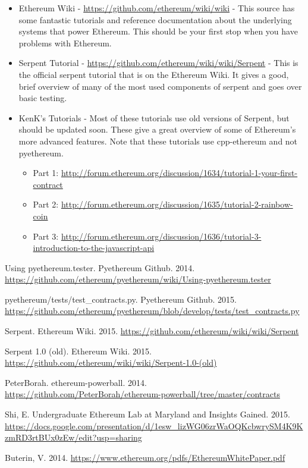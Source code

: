 \documentclass[12pt]{article}
\begin{document}
\begin{itemize}
	\item Ethereum Wiki - \url{https://github.com/ethereum/wiki/wiki} - This source has some fantastic tutorials and reference documentation about the underlying systems that power Ethereum. This should be your first stop when you have problems with Ethereum.
	\item Serpent Tutorial - \url{https://github.com/ethereum/wiki/wiki/Serpent} - This is the official serpent tutorial that is on the Ethereum Wiki. It gives a good, brief overview of many of the most used components of serpent and goes over basic testing.
	\item KenK's Tutorials - Most of these tutorials use old versions of Serpent, but should be updated soon. These give a great overview of some of Ethereum's more advanced features. Note that these tutorials use cpp-ethereum and not pyethereum.
	\begin{itemize}
	\item Part 1: \url{http://forum.ethereum.org/discussion/1634/tutorial-1-your-first-contract}
	\item Part 2: \url{http://forum.ethereum.org/discussion/1635/tutorial-2-rainbow-coin}
	\item Part 3: \url{http://forum.ethereum.org/discussion/1636/tutorial-3-introduction-to-the-javascript-api}
	\end{itemize}
\end{itemize}

\begin{thebibliography}{9}

	Using pyethereum.tester. Pyethereum Github. 2014. \url{https://github.com/ethereum/pyethereum/wiki/Using-pyethereum.tester}

	pyethereum/tests/test\_contracts.py. Pyethereum Github. 2015. \url{https://github.com/ethereum/pyethereum/blob/develop/tests/test_contracts.py}

	Serpent. Ethereum Wiki. 2015. \url{https://github.com/ethereum/wiki/wiki/Serpent}

	Serpent 1.0 (old). Ethereum Wiki. 2015. \url{https://github.com/ethereum/wiki/wiki/Serpent-1.0-(old)}

	PeterBorah. ethereum-powerball. 2014. \url{https://github.com/PeterBorah/ethereum-powerball/tree/master/contracts}

	Shi, E. Undergraduate Ethereum Lab at Maryland and Insights Gained. 2015. \url{https://docs.google.com/presentation/d/1esw_lizWG06zrWaOQKcbwrySM4K9KzmRD3rtBUx0zEw/edit?usp=sharing}

	Buterin, V. 2014. \url{https://www.ethereum.org/pdfs/EthereumWhitePaper.pdf}
\end{thebibliography}
\end{document}
